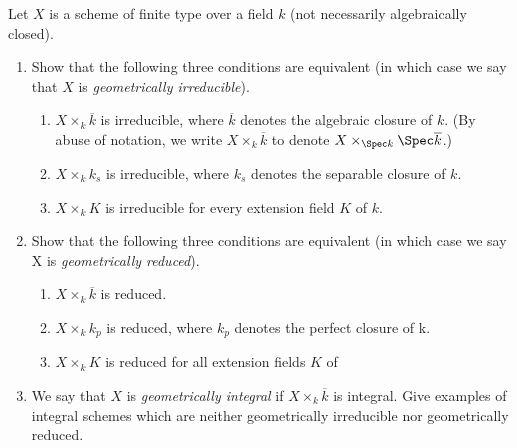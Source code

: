 \begin{exercise}
	Let $X $ is a scheme of finite type over a field $k $ (not necessarily algebraically closed).
	\begin{enumerate}
		\item Show that the following three conditions are equivalent (in which case we say that $X $ is \textit{geometrically irreducible}).
			\begin{enumerate}
				\item $X \times _k \overline{k}  $ is irreducible, where $\overline{k}  $ denotes the algebraic closure of $k $. (By abuse of notation, we write $X \times _k \overline{k}  $ to denote $X \times _{\Spec k} \Spec \overline{k}$.) 
				\item $X \times _k k_s $ is irreducible, where $k_s $ denotes the separable closure of $k $.
				\item $X \times _k K $ is irreducible for every extension field $K $ of $k $.
			\end{enumerate}
		\item Show that the following three conditions are equivalent (in which case we say X is \textit{geometrically reduced}).
			\begin{enumerate}
				\item $X \times_k \overline{k}$ is reduced. 
				\item $X \times_k k_p$ is reduced, where $k_p $ denotes the perfect closure of k. 
				\item $X \times_k K$ is reduced for all extension fields $K$ of 
			\end{enumerate}
		\item We say that $X $ is \textit{geometrically integral} if $X \times _k \overline{k}  $ is integral. Give examples of integral schemes which are neither geometrically irreducible nor geometrically reduced. 
	\end{enumerate}
\end{exercise}

